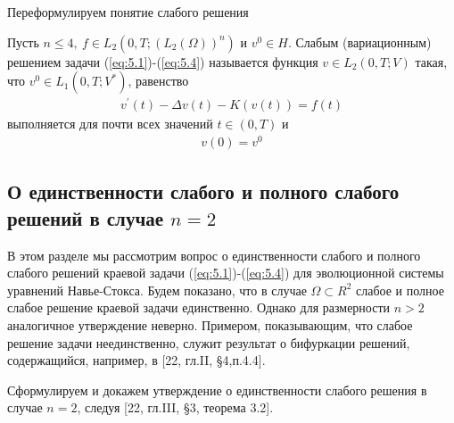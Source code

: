 Переформулируем понятие слабого решения
\begin{definition}
    Пусть $n \le 4, \ f \in L_2(0, T; (L_2(\Omega))^n)$ и $v^0 \in H$. Слабым (вариационным) решением задачи (\ref{eq:5.1})-(\ref{eq:5.4}) называется функция
    $v \in L_2(0, T; V)$ такая, что $v^0 \in L_1(0, T; V^\ast)$, равенство
    \begin{equation}\label{eq:5.11}
        \begin{gathered}
            v^\prime(t) - \Delta v(t) - K(v(t)) = f(t)
        \end{gathered}
    \end{equation}
    выполняется для почти всех значений $t \in (0, T)$ и
    \begin{equation}\label{eq:5.12}
        \begin{gathered}
            v(0) = v^0
        \end{gathered}
    \end{equation}
\end{definition}


\subsection {О единственности слабого и полного слабого решений в случае $n = 2$}
В этом разделе мы рассмотрим вопрос о единственности слабого и полного слабого решений краевой задачи (\ref{eq:5.1})-(\ref{eq:5.4}) для эволюционной
системы уравнений Навье-Стокса. Будем показано, что в случае $\Omega \subset R^2$ слабое и полное слабое решение краевой задачи единственно.
Однако для размерности $n > 2$ аналогичное утверждение неверно. Примером, показывающим, что слабое решение задачи неединственно, служит результат
о бифуркации решений, содержащийся, например, в [22, гл.II, \S 4,п.4.4].

Сформулируем и докажем утверждение о единственности слабого решения в случае $n = 2$, следуя [22, гл.III, \S 3, теорема 3.2].

